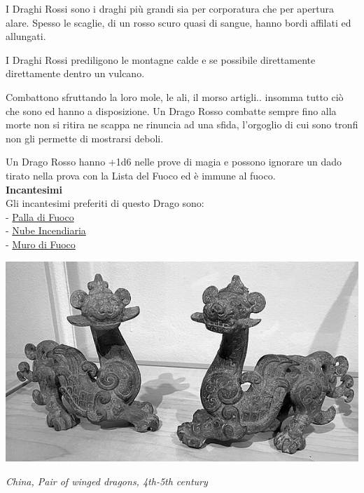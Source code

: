 \begin{multicols}{2}
{I Draghi Rossi sono i draghi più grandi sia per corporatura che per apertura alare.
Spesso le scaglie, di un rosso scuro quasi di sangue, hanno bordi affilati ed allungati.

I Draghi Rossi prediligono le montagne calde e se possibile direttamente direttamente dentro un vulcano.

Combattono sfruttando la loro mole, le ali, il morso artigli.. insomma tutto ciò che sono ed hanno a disposizione. Un Drago Rosso combatte sempre fino alla morte non si ritira ne scappa ne rinuncia ad una sfida, l'orgoglio di cui sono tronfi non gli permette di mostrarsi deboli.

Un Drago Rosso hanno +1d6 nelle prove di magia e possono ignorare un dado tirato nella prova con la Lista del Fuoco ed è immune al fuoco.\\
\textbf{Incantesimi}\\
Gli incantesimi preferiti di questo Drago sono:\\
- \hyperlink{Palla di Fuoco}{Palla di Fuoco}\\
- \hyperlink{Nube Incendiaria}{Nube Incendiaria}\\
- \hyperlink{Muro di Fuoco}{Muro di Fuoco}


\begin{center}
\includegraphics[width=0.9\linewidth]{immagini/Pair_of_winged_dragons.png}

\emph{China, Pair of winged dragons, 4th-5th century}
\end{center}

}
\end{multicols}
